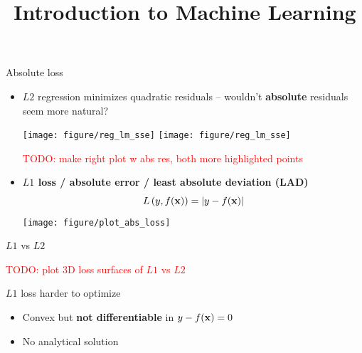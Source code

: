 \documentclass[11pt,compress,t,notes=noshow, xcolor=table]{beamer}
\title{Introduction to Machine Learning}
\institute{\href{https://compstat-lmu.github.io/lecture_i2ml/}{compstat-lmu.github.io/lecture\_i2ml}}
\date{}
\begin{document}


\begin{vbframe}{Absolute loss}

\begin{itemize}
    \item $L2$ regression minimizes quadratic residuals -- wouldn't
    \textbf{absolute} residuals seem more natural?

    \vspace{0.2cm}
    \texttt{[image: figure/reg\_lm\_sse]}
    \texttt{[image: figure/reg\_lm\_sse]}

    \textcolor{red}{TODO: make right plot w abs res, both more highlighted
    points
    }
    \item \textbf{$L1$ loss / absolute error / least absolute deviation (LAD)}
    $$
    L\left(y, f(\mathbf{x})\right) = |y-f(\mathbf{x})|
    $$
    \texttt{[image: figure/plot\_abs\_loss]}
\end{itemize}

\end{vbframe}


\begin{vbframe}{$L1$ vs $L2$}

\textcolor{red}{TODO: plot 3D loss surfaces of $L1$ vs $L2$}

\vfill

$L1$ loss harder to optimize
\begin{itemize}
    \item Convex but \textbf{not differentiable} in
    $y - f(\mathbf{x}) = 0$
    \item No analytical solution
\end{itemize}

\end{vbframe}

\end{document}
